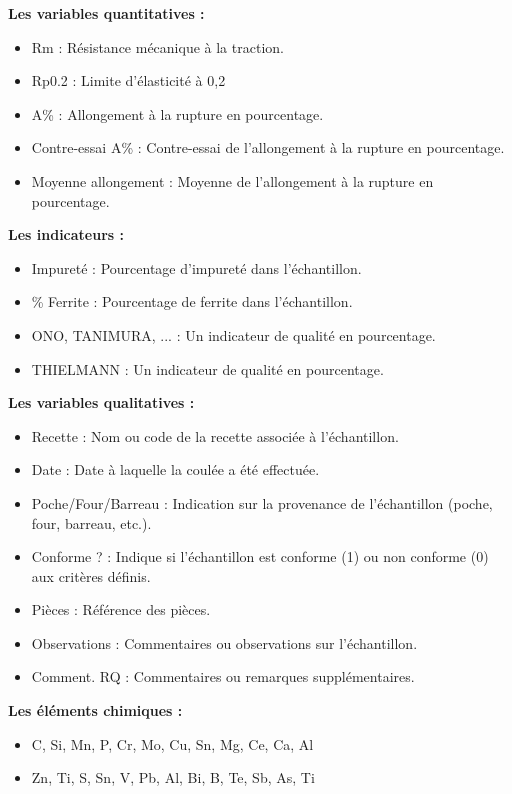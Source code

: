 \documentclass[12pt]{article}
\begin{document}


\textbf{Les variables quantitatives :}

\begin{itemize}
\item Rm : Résistance mécanique à la traction.
\item Rp0.2 : Limite d'élasticité à 0,2%
\item A\% : Allongement à la rupture en pourcentage.
\item Contre-essai A\% : Contre-essai de l'allongement à la rupture en pourcentage.
\item Moyenne allongement : Moyenne de l'allongement à la rupture en pourcentage.
\end{itemize}
    

\textbf{Les indicateurs :}

\begin{itemize}
\item Impureté : Pourcentage d'impureté dans l'échantillon.
\item \% Ferrite : Pourcentage de ferrite dans l'échantillon.
\item ONO, TANIMURA, ... : Un indicateur de qualité en pourcentage.
\item THIELMANN : Un indicateur de qualité en pourcentage.
\end{itemize}
 

\textbf{Les variables qualitatives :}

\begin{itemize}
\item Recette : Nom ou code de la recette associée à l'échantillon.
\item Date : Date à laquelle la coulée a été effectuée.
\item Poche/Four/Barreau : Indication sur la provenance de l'échantillon (poche, four, barreau, etc.).
\item Conforme ? : Indique si l'échantillon est conforme (1) ou non conforme (0) aux critères définis.
\item Pièces : Référence des pièces.
\item Observations : Commentaires ou observations sur l'échantillon.
\item Comment. RQ : Commentaires ou remarques supplémentaires.
\end{itemize}

\textbf{Les éléments chimiques :}

\begin{itemize}
\item C, Si, Mn, P, Cr, Mo, Cu, Sn, Mg, Ce, Ca, Al 
\item Zn, Ti, S, Sn, V, Pb, Al, Bi, B, Te, Sb, As, Ti 
\end{itemize}
\end{document}
